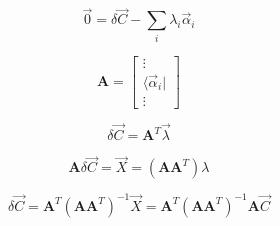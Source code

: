 \documentclass[aps,12pt]{revtex4}
\begin{document}
\begin{equation}
	\vec 0 = \delta \vec C - \sum_i \lambda_i \vec\alpha_i
\end{equation}

\begin{equation}
	\bm{A} = 
	\begin{bmatrix}
	\vdots\\
	\langle \vec \alpha_i \vert \\
	\vdots
	\end{bmatrix}
\end{equation}

\begin{equation}
	\delta \vec C = \bm{A}^T \vec \lambda
\end{equation}

\begin{equation}
	\bm{A} \delta \vec C = \vec X = \left(\bm{A} \bm{A}^T\right) \lambda
\end{equation}

\begin{equation}
	\delta \vec{C} = \bm{A}^T \left(\bm{A} \bm{A}^T\right)^{-1} \vec{X} = \bm{A}^T \left(\bm{A} \bm{A}^T\right)^{-1} \bm{A} \vec{C}
\end{equation}
\end{document}

